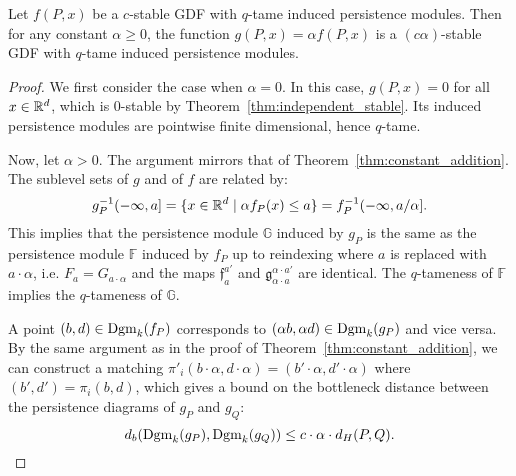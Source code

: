 \begin{theorem}
    \label{thm:constant_nonneg_multiplication}
    Let $f(P, x)$ be a $c$-stable GDF with $q$-tame induced persistence modules.
    Then for any constant $\alpha \geq 0$, the function
    $g(P, x) = \alpha f(P, x)$ is a $(c\alpha)$-stable GDF with $q$-tame induced
    persistence modules.
\end{theorem}
\begin{proof}
    We first consider the case when $\alpha = 0$.
    In this case, $g(P, x) = 0$ for all $x \in \mathbb{R}^d$, which is $0$-stable
    by Theorem~\ref{thm:independent_stable}. Its induced persistence modules
    are pointwise finite dimensional, hence $q$-tame.
    
    Now, let $\alpha > 0$.
    The argument mirrors that of Theorem~\ref{thm:constant_addition}.
    The sublevel sets of $g$ and of $f$ are related by:
    \begin{equation}
        g^{-1}_P(-\infty, a] = \{x \in \mathbb{R}^d \mid \alpha f_P(x) \leq a\} = f^{-1}_P(-\infty, a/\alpha].
    \end{equation}
    This implies that the persistence module $\mathbb{G}$ induced by $g_P$ is
    the same as the persistence module $\mathbb{F}$ induced by $f_P$ up to reindexing where $a$ is replaced with $a \cdot \alpha$, i.e.
    $F_a = G_{a \cdot \alpha}$ and the maps $\mathfrak{f}_a^{a'}$ and
    $\mathfrak{g}_{\alpha \cdot a}^{\alpha \cdot a'}$ are identical.
    The $q$-tameness of $\mathbb{F}$ implies the $q$-tameness of $\mathbb{G}$.

    A point $(b, d)\in \operatorname{Dgm}_k(f_P)$ corresponds to $(\alpha b, \alpha d) \in
    \operatorname{Dgm}_k(g_P)$ and vice versa. By the same argument as in the proof of
    Theorem~\ref{thm:constant_addition}, we can construct a matching
    $\pi'_i(b \cdot \alpha, d \cdot \alpha) = (b' \cdot \alpha, d' \cdot \alpha)$ where
    $(b', d') = \pi_i(b, d)$, which gives a bound on the bottleneck distance
    between the persistence diagrams of $g_P$ and $g_Q$:
    \begin{equation}
        d_b(\operatorname{Dgm}_k(g_P), \operatorname{Dgm}_k(g_Q)) \leq c \cdot \alpha \cdot d_H(P, Q).
    \end{equation}
\end{proof}

